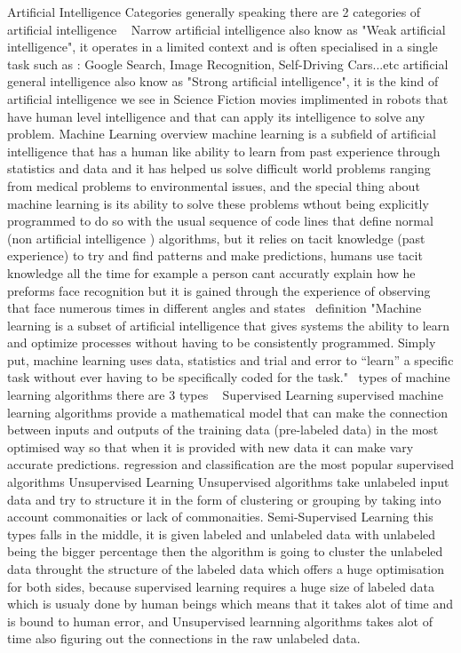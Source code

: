     Artificial Intelligence Categories
        generally speaking there are 2 categories of artificial intelligence ~\cite{ai}
            Narrow artificial intelligence
                also know as "Weak artificial intelligence", it operates in a limited context and is often specialised in a single task such as : Google Search, Image Recognition, Self-Driving Cars...etc
            artificial general intelligence
                also know as "Strong artificial intelligence", it is the kind of artificial intelligence we see in Science Fiction movies implimented in robots that have human level intelligence and that can apply its intelligence to solve any problem.
Machine Learning
    overview
        machine learning is a subfield of artificial intelligence that has a human like ability to learn from past experience through statistics and data and it has helped us solve difficult world problems ranging from medical problems to environmental issues, and the special thing about machine learning is its ability to solve these problems wthout being explicitly programmed to do so with the usual sequence of code lines that define normal (non artificial intelligence ) algorithms, but it relies on tacit knowledge (past experience) to try and find patterns and make predictions, humans use tacit knowledge all the time for example a person cant accuratly explain how he preforms face recognition but it is gained through the experience of observing that face numerous times in different angles and states~\cite{ml}
    definition
        "Machine learning is a subset of artificial intelligence that gives systems the ability to learn and optimize processes without having to be consistently programmed. Simply put, machine learning uses data, statistics and trial and error to “learn” a specific task without ever having to be specifically coded for the task."~\cite{ml}
    types of machine learning algorithms
        there are 3 types ~\cite{ml}
        Supervised Learning
            supervised machine learning algorithms provide a mathematical model that can make the connection between inputs and outputs of the training data (pre-labeled data) in the most optimised way so that when it is provided with new data it can make vary accurate predictions. regression and classification are the most popular supervised algorithms 
        Unsupervised Learning
            Unsupervised algorithms take unlabeled input data and try to structure it in the form of clustering or grouping by taking into account commonaities or lack of commonaities.
        Semi-Supervised Learning
            this types falls in the middle, it is given labeled and unlabeled data with unlabeled being the bigger percentage then the algorithm is going to cluster the unlabeled data throught the structure of the labeled data which offers a huge optimisation for both sides, because supervised learning requires a huge size of labeled data which is usualy done by human beings which means that it takes alot of time and is bound to human error, and Unsupervised learnning algorithms takes alot of time also figuring out the connections in the raw unlabeled data.
